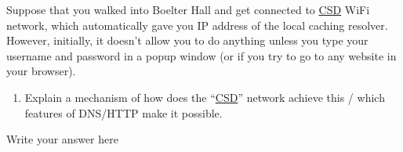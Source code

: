 \documentclass{report}
\begin{document}








\clearpage
\begin{problem}

Suppose that you walked into Boelter Hall and get connected to \url{CSD} WiFi network, which automatically gave you IP address of the local caching resolver.
However, initially, it doesn't allow you to do anything unless you type your username and password in a popup window (or if you try to go to any website in your browser).

\begin{enumerate}

\item Explain a mechanism of how does the ``\url{CSD}'' network achieve this / which features of DNS/HTTP make it possible.

\end{enumerate}



\begin{answer}{30em}
    Write your answer here

\end{answer}


\end{problem}
\end{document}
